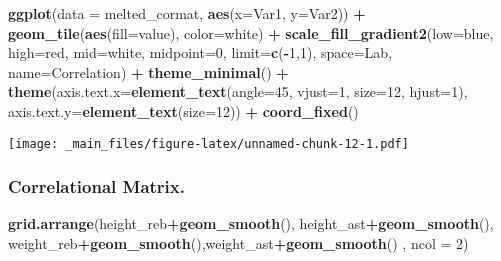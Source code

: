 \documentclass[
]{book}
\newenvironment{Shaded}{\begin{snugshade}}{\end{snugshade}}
\newcommand{\AttributeTok}[1]{\textcolor[rgb]{0.13,0.29,0.53}{#1}}
\newcommand{\DecValTok}[1]{\textcolor[rgb]{0.00,0.00,0.81}{#1}}
\newcommand{\FunctionTok}[1]{\textcolor[rgb]{0.13,0.29,0.53}{\textbf{#1}}}
\newcommand{\NormalTok}[1]{#1}
\newcommand{\SpecialCharTok}[1]{\textcolor[rgb]{0.81,0.36,0.00}{\textbf{#1}}}
\newcommand{\StringTok}[1]{\textcolor[rgb]{0.31,0.60,0.02}{#1}}
\theoremstyle{definition}
\theoremstyle{definition}
\theoremstyle{definition}
\theoremstyle{definition}
\theoremstyle{remark}
\begin{document}
\begin{Shaded}
\begin{Highlighting}[]
\FunctionTok{ggplot}\NormalTok{(}\AttributeTok{data =}\NormalTok{ melted\_cormat, }\FunctionTok{aes}\NormalTok{(}\AttributeTok{x=}\NormalTok{Var1, }\AttributeTok{y=}\NormalTok{Var2)) }\SpecialCharTok{+}
  \FunctionTok{geom\_tile}\NormalTok{(}\FunctionTok{aes}\NormalTok{(}\AttributeTok{fill=}\NormalTok{value), }\AttributeTok{color=}\StringTok{\textquotesingle{}white\textquotesingle{}}\NormalTok{) }\SpecialCharTok{+}
  \FunctionTok{scale\_fill\_gradient2}\NormalTok{(}\AttributeTok{low=}\StringTok{\textquotesingle{}blue\textquotesingle{}}\NormalTok{, }\AttributeTok{high=}\StringTok{\textquotesingle{}red\textquotesingle{}}\NormalTok{, }\AttributeTok{mid=}\StringTok{\textquotesingle{}white\textquotesingle{}}\NormalTok{, }\AttributeTok{midpoint=}\DecValTok{0}\NormalTok{, }\AttributeTok{limit=}\FunctionTok{c}\NormalTok{(}\SpecialCharTok{{-}}\DecValTok{1}\NormalTok{,}\DecValTok{1}\NormalTok{), }\AttributeTok{space=}\StringTok{\textquotesingle{}Lab\textquotesingle{}}\NormalTok{, }\AttributeTok{name=}\StringTok{\textquotesingle{}Correlation\textquotesingle{}}\NormalTok{) }\SpecialCharTok{+}
  \FunctionTok{theme\_minimal}\NormalTok{() }\SpecialCharTok{+}
  \FunctionTok{theme}\NormalTok{(}\AttributeTok{axis.text.x=}\FunctionTok{element\_text}\NormalTok{(}\AttributeTok{angle=}\DecValTok{45}\NormalTok{, }\AttributeTok{vjust=}\DecValTok{1}\NormalTok{, }\AttributeTok{size=}\DecValTok{12}\NormalTok{, }\AttributeTok{hjust=}\DecValTok{1}\NormalTok{),}
        \AttributeTok{axis.text.y=}\FunctionTok{element\_text}\NormalTok{(}\AttributeTok{size=}\DecValTok{12}\NormalTok{)) }\SpecialCharTok{+}
  \FunctionTok{coord\_fixed}\NormalTok{()}
\end{Highlighting}
\end{Shaded}

\texttt{[image: \_main\_files/figure-latex/unnamed-chunk-12-1.pdf]}

\hypertarget{correlational-matrix.}{%
\subsubsection{Correlational Matrix.}\label{correlational-matrix.}}

\begin{Shaded}
\begin{Highlighting}[]
\FunctionTok{grid.arrange}\NormalTok{(height\_reb}\SpecialCharTok{+}\FunctionTok{geom\_smooth}\NormalTok{(), height\_ast}\SpecialCharTok{+}\FunctionTok{geom\_smooth}\NormalTok{(), weight\_reb}\SpecialCharTok{+}\FunctionTok{geom\_smooth}\NormalTok{(),weight\_ast}\SpecialCharTok{+}\FunctionTok{geom\_smooth}\NormalTok{() , }\AttributeTok{ncol =} \DecValTok{2}\NormalTok{)}
\end{Highlighting}
\end{Shaded}
\end{document}
